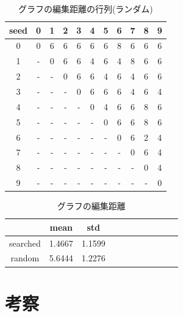 \documentclass[twocolumn]{jarticle}     %
\begin{document}
\begin{table}[tb]
  \begin{center}
    \caption{グラフの編集距離の行列(ランダム)}
    \begin{tabular}{|c||c|c|c|c|c|c|c|c|c|c|} \hline
      seed & 0 & 1 & 2 & 3 & 4 & 5 & 6 & 7 & 8 & 9 \\ \hline \hline
      0 & 0 & 6 & 6 & 6 & 6 & 6 & 8 & 6 & 6 & 6 \\ \hline
      1 & - & 0 & 6 & 6 & 4 & 6 & 4 & 8 & 6 & 6 \\ \hline
      2 & - & - & 0 & 6 & 6 & 4 & 6 & 4 & 6 & 6 \\ \hline
      3 & - & - & - & 0 & 6 & 6 & 6 & 4 & 6 & 4 \\ \hline
      4 & - & - & - & - & 0 & 4 & 6 & 6 & 8 & 6 \\ \hline
      5 & - & - & - & - & - & 0 & 6 & 6 & 8 & 6 \\ \hline
      6 & - & - & - & - & - & - & 0 & 6 & 2 & 4 \\ \hline
      7 & - & - & - & - & - & - & - & 0 & 6 & 4 \\ \hline
      8 & - & - & - & - & - & - & - & - & 0 & 4 \\ \hline
      9 & - & - & - & - & - & - & - & - & - & 0 \\ \hline
    \end{tabular}
    \label{tab:dist_random}
  \end{center}
\end{table}

\begin{table}[tb]
  \begin{center}
    \caption{グラフの編集距離}
    \begin{tabular}{|c||c|c|c|c|c|c|c|c|c|c|} \hline
       & mean & std \\ \hline \hline
      searched & 1.4667 & 1.1599 \\ \hline
      random & 5.6444 & 1.2276 \\ \hline
    \end{tabular}
    \label{tab:dist}
  \end{center}
\end{table}



\section{考察}
\end{document}
